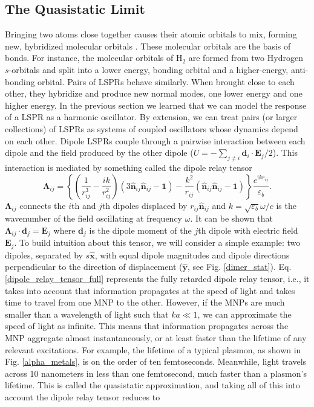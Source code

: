\documentclass [11pt, proquest] {uwthesis}[2016/11/22]
\begin{document}
\subsection{The Quasistatic Limit}
Bringing two atoms close together causes their atomic orbitals to mix, forming new, hybridized molecular orbitals \cite{LennardJones}. These molecular orbitals are the basis of bonds. For instance, the molecular orbitals of $\textrm{H}_2$  are formed from two Hydrogen $s$-orbitals and split into a lower energy, bonding orbital and a higher-energy, anti-bonding orbital. Pairs of LSPRs behave similarly. When brought close to each other, they hybridize and produce new normal modes, one lower energy and one higher energy. In the previous section we learned that we can model the response of a LSPR as a harmonic oscillator. By extension, we can treat pairs (or larger collections) of LSPRs as systems of coupled oscillators whose dynamics depend on each other. Dipole LSPRs couple through a pairwise interaction between each dipole and the field produced by the other dipole ($U = -\sum_{j\neq i}\textbf{d}_i\cdot\textbf{E}_j/2$). This interaction is mediated by something called the dipole relay tensor
\begin{equation}
\boldsymbol{\Lambda}_{ij} = \left\{\left(\frac{1}{r_{ij}^3} - \frac{ik}{r_{ij}^2}\right)\left(3\hat{\textbf{n}}_{ij}\hat{\textbf{n}}_{ij} - \textbf{1}\right) - \frac{k^2}{r_{ij}}\left(\hat{\textbf{n}}_{ij}\hat{\textbf{n}}_{ij} - \textbf{1}\right)\right\}\frac{e^{\textrm{i}kr_{ij}}}{\varepsilon_b}.
\label{dipole_relay_tensor_full}
\end{equation}
$\boldsymbol{\Lambda}_{ij}$ connects the $i$th and $j$th dipoles displaced by $r_{ij}\hat{\textbf{n}}_{ij}$ and $k=\sqrt{\varepsilon_b}\omega/c$ is the wavenumber of the field oscillating at frequency $\omega$. It can be shown that $\boldsymbol{\Lambda}_{ij}\cdot\textbf{d}_j = \textbf{E}_j$ where $\textbf{d}_j$ is the dipole moment of the $j$th dipole with electric field $\textbf{E}_j$. To build intuition about this tensor, we will consider a simple example: two dipoles, separated by $s\hat{\textbf{x}}$, with equal dipole magnitudes and dipole directions perpendicular to the direction of displacement ($\hat{\textbf{y}}$, see Fig. \ref{dimer_stat}). Eq. \ref{dipole_relay_tensor_full} represents the fully retarded dipole relay tensor, i.e., it takes into account that information propagates at the speed of light and takes time to travel from one MNP to the other. However, if the MNPs are much smaller than a wavelength of light such that $ka \ll 1$, we can approximate the speed of light as infinite. This means that information propagates across the MNP aggregate almost instantaneously, or at least faster than the lifetime of any relevant excitations. For example, the lifetime of a typical plasmon, as shown in Fig. \ref{alpha_metals}, is on the order of ten femtoseconds. Meanwhile, light travels across 10 nanometers in less than one femtosecond, much faster than a plasmon's lifetime. This is called the quasistatic approximation, and taking all of this into account the dipole relay tensor reduces to
\end{document}
